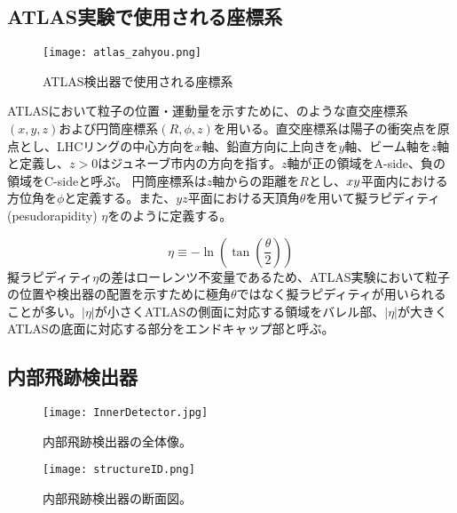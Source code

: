 \subsection{ATLAS実験で使用される座標系}
\label{sec:zahyoukei}
\begin{figure}[tbp]
  \centering
  \texttt{[image: atlas\_zahyou.png]}
  \caption[ATLAS検出器]{ATLAS検出器で使用される座標系 \cite{ATLAS} }
  \label{fig:atlaszahyou}
\end{figure}

ATLASにおいて粒子の位置・運動量を示すために、のような直交座標系$\left( x, y, z \right)$および円筒座標系$\left( R, \phi, z \right)$を用いる。直交座標系は陽子の衝突点を原点とし、LHCリングの中心方向を$x$軸、鉛直方向に上向きを$y$軸、ビーム軸を$z$軸と定義し、$z>0$はジュネーブ市内の方向を指す。$z$軸が正の領域をA-side、負の領域をC-sideと呼ぶ。
円筒座標系は$z$軸からの距離を$R$とし、$x\-y$平面内における方位角を$\phi$と定義する。また、$yz$平面における天頂角$\theta$を用いて擬ラピディティ(pesudorapidity) $\eta$をのように定義する。

\begin{equation}
  \label{eq:eta}
  \eta \equiv  -\ln\left( \tan{\left( \frac{\theta}{2} \right)} \right)
\end{equation}
擬ラピディティ$\eta$の差はローレンツ不変量であるため、ATLAS実験において粒子の位置や検出器の配置を示すために極角$\theta$ではなく擬ラピディティが用いられることが多い。$|\eta|$が小さくATLASの側面に対応する領域をバレル部、$|\eta|$が大きくATLASの底面に対応する部分をエンドキャップ部と呼ぶ。

\subsection{内部飛跡検出器}
\label{sec:InnerDetector}
\begin{figure}[tbp]
  \begin{minipage}[b]{0.45\linewidth}
    \centering
    \texttt{[image: InnerDetector.jpg]}
    \caption{内部飛跡検出器の全体像。}
    \label{fig:InnerDetector}
  \end{minipage}
  \begin{minipage}[b]{0.45\linewidth}
    \centering
    \texttt{[image: structureID.png]}
    \caption{内部飛跡検出器の断面図。}
    \label{fig:structureID}
  \end{minipage}
\end{figure}

